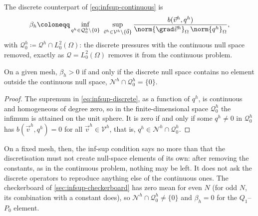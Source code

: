 The discrete counterpart of \cref{eq:infsup-continuous} is
\begin{equation}\label{eq:infsup-discrete}
    \beta_h \coloneqq
    \inf_{q^h \in \mathcal{Q}^h_0 \setminus \{0\}} \ \sup_{\vec{v}^h \in \mathcal{V}^h \setminus \{\vec{0}\}}
    \frac{b(\vec{v}^h, q^h)}{\norm{\grad\vec{v}^h}_\Omega \, \norm{q^h}_\Omega} ,
\end{equation}
with $\mathcal{Q}^h_0 \coloneqq \mathcal{Q}^h \cap L^2_0(\Omega)$: the discrete pressures with the continuous null space removed, exactly as $\mathcal{Q} = L^2_0(\Omega)$ removes it from the continuous problem.

\begin{lemma}\label{lem:infsup-kernel}
On a given mesh, $\beta_h > 0$ if and only if the discrete null space contains no element outside the continuous null space, $\mathcal{N}^h \cap \mathcal{Q}^h_0 = \{0\}$.
\end{lemma}

\begin{proof}
The supremum in \cref{eq:infsup-discrete}, as a function of $q^h$, is continuous and homogeneous of degree zero, so in the finite-dimensional space $\mathcal{Q}^h_0$ the infimum is attained on the unit sphere. It is zero if and only if some $q^h \neq 0$ in $\mathcal{Q}^h_0$ has $b(\vec{v}^h, q^h) = 0$ for all $\vec{v}^h \in \mathcal{V}^h$, that is, $q^h \in \mathcal{N}^h \cap \mathcal{Q}^h_0$.
\end{proof}

On a fixed mesh, then, the inf-sup condition says no more than that the discretisation must not create null-space elements of its own: after removing the constants, as in the continuous problem, nothing may be left. It does not ask the discrete operators to reproduce anything else of the continuous ones. The checkerboard of \cref{sec:infsup-checkerboard} has zero mean for even $N$ (for odd $N$, its combination with a constant does), so $\mathcal{N}^h \cap \mathcal{Q}^h_0 \neq \{0\}$ and $\beta_h = 0$ for the $Q_1$--$P_0$ element.

